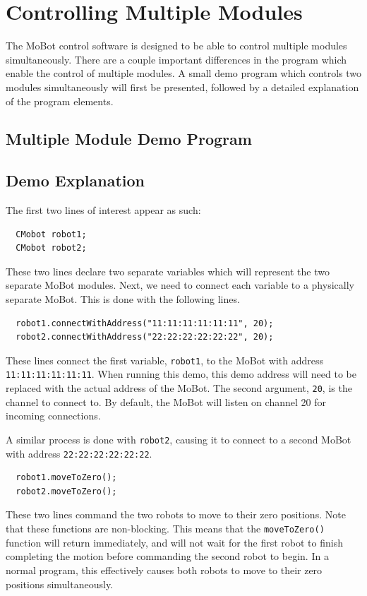 \documentclass{article}
\begin{document}
\section{Controlling Multiple Modules}
The MoBot control software is designed to be able to control multiple modules
simultaneously. There are a couple important differences in the program 
which enable the control of multiple modules. A small demo program which
controls two modules simultaneously will first be presented, followed by
a detailed explanation of the program elements.

\subsection{Multiple Module Demo Program}


\subsection{Demo Explanation}
The first two lines of interest appear as such:
\begin{verbatim}
  CMobot robot1;
  CMobot robot2;
\end{verbatim}
These two lines declare two separate variables which will represent the
two separate MoBot modules. Next, we need to connect each variable to
a physically separate MoBot. This is done with the following lines.
\begin{verbatim}
  robot1.connectWithAddress("11:11:11:11:11:11", 20);
  robot2.connectWithAddress("22:22:22:22:22:22", 20);
\end{verbatim}
These lines connect the first variable, \texttt{robot1}, to the MoBot with
address \texttt{11:11:11:11:11:11}. When running this demo, this
demo address will need to be replaced with the actual address of the MoBot.
The second argument, \texttt{20}, is the channel to connect to. By default,
the MoBot will listen on channel 20 for incoming connections.

A similar process is done with \texttt{robot2}, causing it to connect
to a second MoBot with address \texttt{22:22:22:22:22:22}.

\begin{verbatim}
  robot1.moveToZero();
  robot2.moveToZero();
\end{verbatim}
These two lines command the two robots to move to their zero positions.
Note that these functions are non-blocking. This means that the
\texttt{moveToZero()} function will return immediately, and will not
wait for the first robot to finish completing the motion before 
commanding the second robot to begin. In a normal program, this effectively
causes both robots to move to their zero positions simultaneously.
\end{document}
